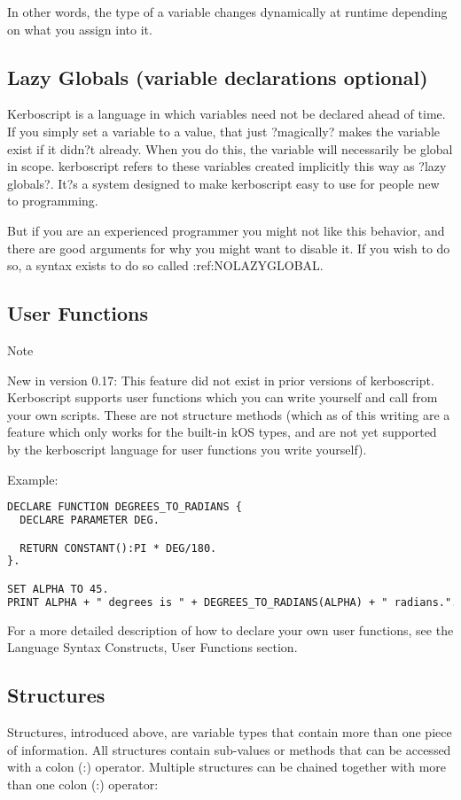 In other words, the type of a variable changes dynamically at runtime depending on what you assign into it.

\subsection{Lazy Globals (variable declarations optional)}
Kerboscript is a language in which variables need not be declared ahead of time. If you simply set a variable to a value, that just ?magically? makes the variable exist if it didn?t already. When you do this, the variable will necessarily be global in scope. kerboscript refers to these variables created implicitly this way as ?lazy globals?. It?s a system designed to make kerboscript easy to use for people new to programming.

But if you are an experienced programmer you might not like this behavior, and there are good arguments for why you might want to disable it. If you wish to do so, a syntax exists to do so called :ref:NOLAZYGLOBAL.

\subsection{User Functions}
Note

New in version 0.17: This feature did not exist in prior versions of kerboscript.
Kerboscript supports user functions which you can write yourself and call from your own scripts. These are not structure methods (which as of this writing are a feature which only works for the built-in kOS types, and are not yet supported by the kerboscript language for user functions you write yourself).

Example:

\begin{lstlisting}[frame=single,language=XML]
DECLARE FUNCTION DEGREES_TO_RADIANS {
  DECLARE PARAMETER DEG.

  RETURN CONSTANT():PI * DEG/180.
}.

SET ALPHA TO 45.
PRINT ALPHA + " degrees is " + DEGREES_TO_RADIANS(ALPHA) + " radians.".
\end{lstlisting}

For a more detailed description of how to declare your own user functions, see the Language Syntax Constructs, User Functions section.

\subsection{Structures}
Structures, introduced above, are variable types that contain more than one piece of information. All structures contain sub-values or methods that can be accessed with a colon (:) operator. Multiple structures can be chained together with more than one colon (:) operator:


